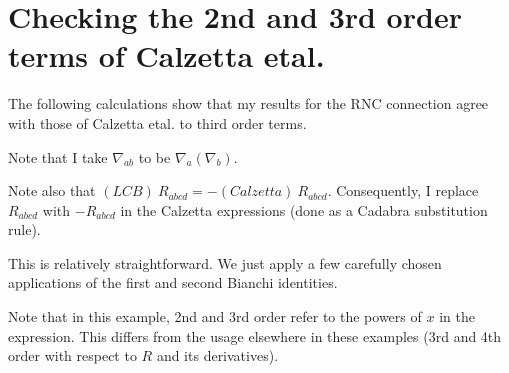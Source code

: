 \documentclass[12pt]{cdblatex}
\begin{document}
\section*{Checking the 2nd and 3rd order terms of Calzetta etal.}

The following calculations show that my results for the RNC connection agree with those of Calzetta etal. to third order terms.

Note that I take $\nabla_{ab}$ to be $\nabla_a\left(\nabla_b\right)$.

Note also that $(LCB)\>R_{abcd} = - (Calzetta)\> R_{abcd}$. Consequently, I replace $R_{abcd}$ with
$-R_{abcd}$ in the Calzetta expressions (done as a Cadabra substitution rule).

This is relatively straightforward. We just apply a few carefully chosen applications of the first and second Bianchi identities.

Note that in this example, 2nd and 3rd order refer to the powers of $x$ in the expression. This differs from
the usage elsewhere in these examples (3rd and 4th order with respect to $R$ and its derivatives).

\clearpage
\end{document}
